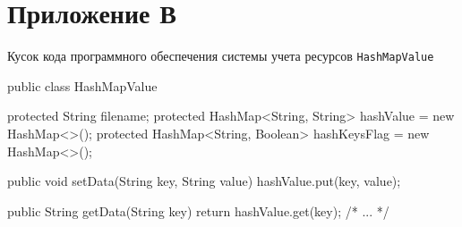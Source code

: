 \documentclass[a4paper,12pt]{article}
\begin{document}
\pagebreak

\section*{ \centering Приложение В} 

\begin{center}
	Кусок кода программного обеспечения системы учета ресурсов \verb|HashMapValue|
\end{center}

\begin{MyCode}

public class HashMapValue {
	
	protected String filename; 
	protected HashMap<String, String> hashValue = 
	new HashMap<>();
	protected HashMap<String, Boolean> hashKeysFlag =
	 new HashMap<>();
	
	public void setData(String key, String value) {
		hashValue.put(key, value);
	}
	
	public String getData(String key) {
		return hashValue.get(key);
	}
    /* ... */
}
\end{MyCode}
\end{document}
